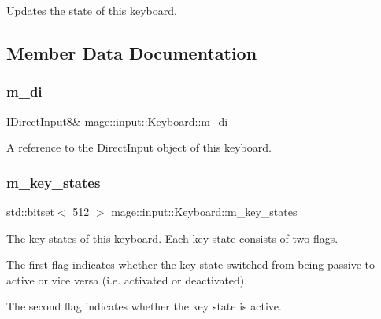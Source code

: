 Updates the state of this keyboard. 

\subsection{Member Data Documentation}
\mbox{\label{classmage_1_1input_1_1_keyboard_a3757173fa08e6744d374e0a5397de11c}} 
\subsubsection{\texorpdfstring{m\+\_\+di}{m\_di}}
{\footnotesize\ttfamily I\+Direct\+Input8\& mage\+::input\+::\+Keyboard\+::m\+\_\+di\hspace{0.3cm}{\ttfamily [private]}}

A reference to the Direct\+Input object of this keyboard. \mbox{\label{classmage_1_1input_1_1_keyboard_ad5b0ec6ca8ff1adbfed19c2382fa8a65}} 
\subsubsection{\texorpdfstring{m\+\_\+key\+\_\+states}{m\_key\_states}}
{\footnotesize\ttfamily std\+::bitset$<$ 512 $>$ mage\+::input\+::\+Keyboard\+::m\+\_\+key\+\_\+states\hspace{0.3cm}{\ttfamily [private]}}

The key states of this keyboard. Each key state consists of two flags.

The first flag indicates whether the key state switched from being passive to active or vice versa (i.\+e. activated or deactivated).

The second flag indicates whether the key state is active. \mbox{\label{classmage_1_1input_1_1_keyboard_ad6993f7c9fc9692708c1f928d0ea1e6b}} 
